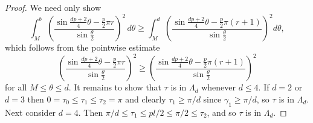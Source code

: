\documentclass{amsart}
\theoremstyle{plain}
\theoremstyle{remark}
\begin{document}
	\begin{proof}
		We need only show
		\[\int_{M}^{b} \left(\frac{\sin \frac{dp+2}{4}\theta-\frac{p}{2}\pi r}{\sin \frac{\theta}{2}}\right)^2 \, d\theta \geq \int_{M}^{d} \left(\frac{\sin \frac{dp+2}{4}\theta-\frac{p}{2}\pi (r+1)}{\sin \frac{\theta}{2}} \right)^2 d\theta,\]
		which follows from the pointwise estimate 
		\[\left(\frac{\sin \frac{dp+2}{4}\theta-\frac{p}{2}\pi r}{\sin \frac{\theta}{2}}\right)^2 \geq \left(\frac{\sin \frac{dp+2}{4}\theta-\frac{p}{2}\pi (r+1)}{\sin \frac{\theta}{2}} \right)^2\] for all $M \leq \theta \leq d$. It remains to show that $\tau$ is in $\Lambda_d$ whenever $d \leq 4$. If $d=2$ or $d=3$ then $0=\tau_0 \leq \tau_1 \leq \tau_2=\pi$ and clearly $\tau_1 \geq \pi/d$ since $\gamma_1 \geq \pi/d$, so $\tau$ is in $\Lambda_d$. Next consider $d=4$. Then $\pi/d \leq \tau_1 \leq pl/2 \leq \pi/2 \leq \tau_2$, and so $\tau$ is in $\Lambda_d$. 
	\end{proof}
	
\end{document}
